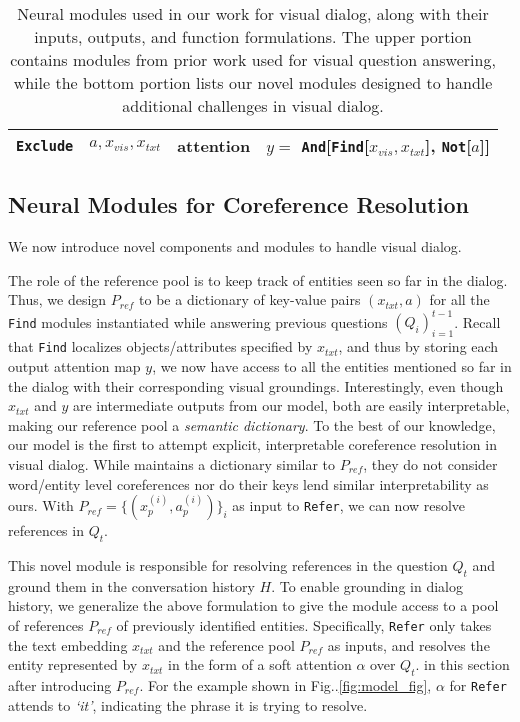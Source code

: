 \documentclass[runningheads]{llncs}
\makeatletter
\DeclareRobustCommand\onedot{\futurelet\@let@token\@onedot}
\def\@onedot{\ifx\@let@token.\else.\null\fi\xspace}
\def\Fig{Fig\onedot}
\newcommand{\myparagraph}[1]{\vspace{0pt}\noindent{\bf #1}}
\makeatother
\begin{document}
\begin{table}[t]
{{\begin{tabularx}{\textwidth}{lccl}
	\texttt{Exclude} & $a, x_{vis}, x_{txt}$ & attention &
		$y =$ \texttt{And}[\texttt{Find}[$x_{vis}, x_{txt}$], 
        					\texttt{Not}[$a$]]\\
    \bottomrule
    \end{tabularx}}}
    \vspace*{3pt}
    \caption{
    Neural modules used in our work for visual dialog, along with their 
    inputs, outputs, and function formulations.
    The upper portion contains modules from prior work used for visual question
    answering, while the bottom portion lists our novel modules designed to 
    handle additional challenges in visual dialog.}
    \label{tab:module_table}
\end{table} \subsection{Neural Modules for Coreference Resolution}
\label{sec:appraoch:modules:coref}
We now introduce novel components and modules to handle visual dialog.

\myparagraph{Reference Pool ($P_{ref}$).}
The role of the reference pool is to keep track of entities seen so far
in the dialog.
Thus, we design $P_{ref}$ to be a dictionary of key-value pairs 
$(x_{txt}, a)$ 
for all the \texttt{Find} modules instantiated while answering
previous questions $(Q_i)_{i=1}^{t-1}$.
Recall that \texttt{Find} localizes objects/attributes specified by 
$x_{txt}$, and thus by storing each output attention map $y$, we now have 
access 
to all the entities mentioned so far in the dialog with their corresponding
visual groundings.
Interestingly, even though $x_{txt}$ and $y$ are intermediate 
outputs from our model, both are easily interpretable, making our reference
pool a \emph{semantic dictionary}.
To the best of our knowledge, our model is the first to attempt explicit,
interpretable coreference resolution in visual dialog.
While \cite{paul2017visual} maintains a dictionary similar to $P_{ref}$,
they do not consider word/entity level coreferences nor do their keys lend 
similar interpretability as ours.
With $P_{ref} = \{(x_p^{(i)}, a_p^{(i)})\}_i$ as input to \texttt{Refer},
we can now resolve references in $Q_t$.

\myparagraph{\texttt{Refer} Module.}
This novel module is responsible for 
resolving references in the question $Q_t$ and ground them in the conversation 
history $H$.
To enable grounding in dialog history, we generalize the above formulation
 to give the module access to a pool of references $P_{ref}$ of previously 
 identified entities.
Specifically, \texttt{Refer} only takes the text embedding $x_{txt}$ and the 
reference pool $P_{ref}$ as inputs, and resolves the entity represented by 
$x_{txt}$ in the form of a soft attention $\alpha$ over $Q_t$.
in this section after introducing $P_{ref}$.
For the example shown in \Fig\ref{fig:model_fig},
$\alpha$ for \texttt{Refer} attends to \textit{`it'}, indicating the phrase it
is trying to resolve.
\end{document}
